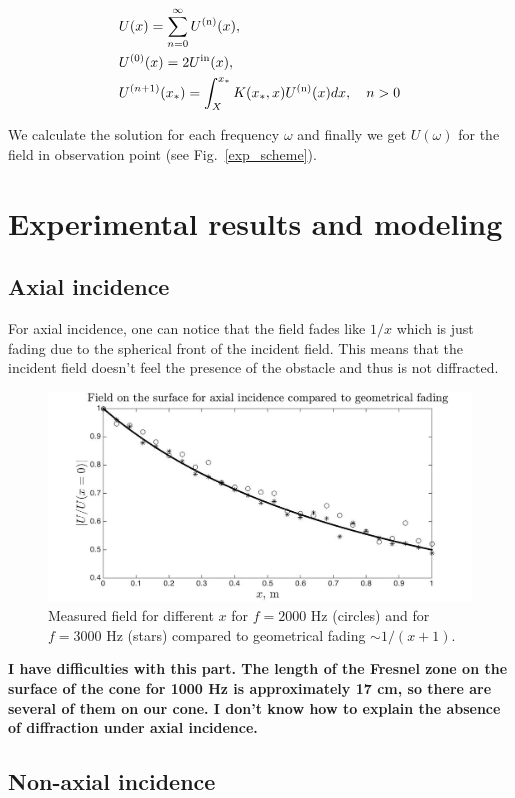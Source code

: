 \documentclass{procDDs}
\begin{document}
\begin{align}                       %
& U(x) = \sum_{n=0}^{\infty} U^{\text{(n)}}(x) ,\notag\\
& U^{(0)}(x) = 2U^{\text{in}}(x),\label{key3}\\
& U^{(n+1)}(x_*) = \int_X^{x_*} K(x_*, x) U^{\text{(n)}}(x) dx, \quad n>0 \notag 
\end{align}

We calculate the solution for each frequency $\omega$ and finally we get $U(\omega)$ for the field in observation point (see Fig.~\ref{exp_scheme}). 


\section{Experimental results and modeling}

\subsection{Axial incidence}

For axial incidence, one can notice that the field fades like $1/x$ which is just fading due to the spherical front of the incident field. This means that the incident field doesn't feel the presence of the obstacle and thus is not diffracted.



\begin{figure}[t!]\centering
	\includegraphics[width=.5\textwidth]{axial.jpg}
	\caption{Measured field for different $x$ for $f = 2000$ Hz (circles) and for $f = 3000$ Hz (stars) compared to geometrical fading $\sim 1/(x+1)$.}\label{axial}
\end{figure}

\textbf{I have difficulties with this part. The length of the Fresnel zone on the surface of the cone for 1000 Hz is approximately 17 cm, so there are several of them on our cone. I don't know how to explain the absence of diffraction under axial incidence.}

\subsection{Non-axial incidence}
\end{document}
